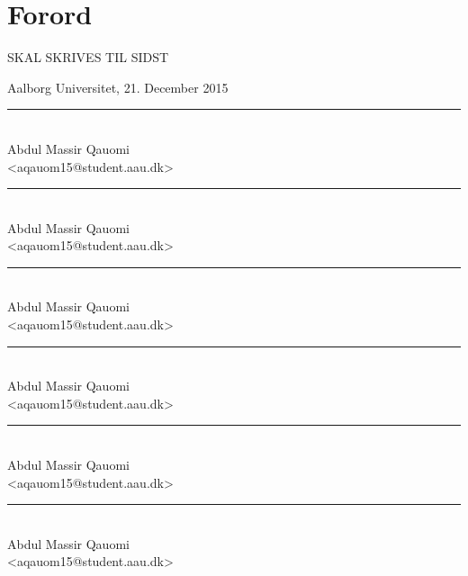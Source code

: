 \chapter{Forord}
\label{chap:Forord}

SKAL SKRIVES TIL SIDST

\vspace{\baselineskip}\hfill Aalborg Universitet, 21. December 2015
\vfill

\noindent
\begin{minipage}[b]{0.45\textwidth}
 \centering
 \rule{\textwidth}{0.5pt}\\
  Abdul Massir Qauomi\\
 {\footnotesize <aqauom15@student.aau.dk>}
\end{minipage}
%
\hfill
%
\begin{minipage}[b]{0.45\textwidth}
 \centering
 \rule{\textwidth}{0.5pt}\\
  Abdul Massir Qauomi\\
 {\footnotesize <aqauom15@student.aau.dk>}
\end{minipage}
%
\vspace{3\baselineskip}

\noindent
\begin{minipage}[b]{0.45\textwidth}
 \centering
 \rule{\textwidth}{0.5pt}\\
  Abdul Massir Qauomi\\
 {\footnotesize <aqauom15@student.aau.dk>}
\end{minipage}
%
\hfill
%
\begin{minipage}[b]{0.45\textwidth}
 \centering
 \rule{\textwidth}{0.5pt}\\
  Abdul Massir Qauomi\\
 {\footnotesize <aqauom15@student.aau.dk>}
\end{minipage}
\vspace{3\baselineskip}

\noindent
\begin{minipage}[b]{0.45\textwidth}
 \centering
 \rule{\textwidth}{0.5pt}\\
  Abdul Massir Qauomi\\
 {\footnotesize <aqauom15@student.aau.dk>}
\end{minipage}
%
\hfill
%
\begin{minipage}[b]{0.45\textwidth}
 \centering
 \rule{\textwidth}{0.5pt}\\
  Abdul Massir Qauomi\\
 {\footnotesize <aqauom15@student.aau.dk>}
\end{minipage}
\vspace{3\baselineskip}
